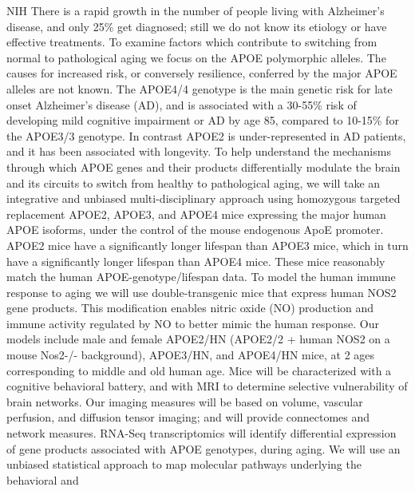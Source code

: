 \documentclass[10pt,colorlinks=true,urlcolor=blue]{moderncv}
\begin{document}
%
    {NIH}%
    {
        There is a rapid growth in the number of people living with
        Alzheimer's disease, and only 25\% get diagnosed; still we do
        not know its etiology or have effective treatments. To examine
        factors which contribute to switching from normal to
        pathological aging we focus on the APOE polymorphic alleles. The
        causes for increased risk, or conversely resilience, conferred
        by the major APOE alleles are not known. The APOE4/4 genotype is
        the main genetic risk for late onset Alzheimer's disease (AD),
        and is associated with a 30-55\% risk of developing mild
        cognitive impairment or AD by age 85, compared to 10-15\% for
        the APOE3/3 genotype. In contrast APOE2 is under-represented in
        AD patients, and it has been associated with longevity. To help
        understand the mechanisms through which APOE genes and their
        products differentially modulate the brain and its circuits to
        switch from healthy to pathological aging, we will take an
        integrative and unbiased multi-disciplinary approach using
        homozygous targeted replacement APOE2, APOE3, and APOE4 mice
        expressing the major human APOE isoforms, under the control of
        the mouse endogenous ApoE promoter. APOE2 mice have a
        significantly longer lifespan than APOE3 mice, which in turn
        have a significantly longer lifespan than APOE4 mice. These mice
        reasonably match the human APOE-genotype/lifespan data. To model
        the human immune response to aging we will use double-transgenic
        mice that express human NOS2 gene products. This modification
        enables nitric oxide (NO) production and immune activity
        regulated by NO to better mimic the human response. Our models
        include male and female APOE2/HN (APOE2/2 + human NOS2 on a
        mouse Nos2-/- background), APOE3/HN, and APOE4/HN mice, at 2
        ages corresponding to middle and old human age.  Mice will be
        characterized with a cognitive behavioral battery, and with MRI
        to determine selective vulnerability of brain networks. Our
        imaging measures will be based on volume, vascular perfusion,
        and diffusion tensor imaging; and will provide connectomes and
        network measures. RNA-Seq transcriptomics will identify
        differential expression of gene products associated with APOE
        genotypes, during aging. We will use an unbiased statistical
        approach to map molecular pathways underlying the behavioral and
}
\end{document}
